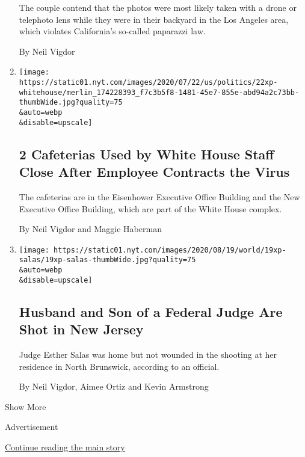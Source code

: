\begin{enumerate}
  The couple contend that the photos were most likely taken with a drone
  or telephoto lens while they were in their backyard in the Los Angeles
  area, which violates California's so-called paparazzi law.

  By Neil Vigdor
\item
  \href{/2020/07/22/us/politics/white-house-employee-covid-19.html}{}

  \texttt{[image: https://static01.nyt.com/images/2020/07/22/us/politics/22xp-whitehouse/merlin\_174228393\_f7c3b5f8-1481-45e7-855e-abd94a2c73bb-thumbWide.jpg?quality=75\\\&auto=webp\\\&disable=upscale]}

  \hypertarget{2-cafeterias-used-by-white-house-staff-close-after-employee-contracts-the-virus}{%
  \subsection{2 Cafeterias Used by White House Staff Close After
  Employee Contracts the
  Virus}\label{2-cafeterias-used-by-white-house-staff-close-after-employee-contracts-the-virus}}

  The cafeterias are in the Eisenhower Executive Office Building and the
  New Executive Office Building, which are part of the White House
  complex.

  By Neil Vigdor and Maggie Haberman
\item
  \href{/2020/07/19/nyregion/shooting-nj-judge-esther-salas.html}{}

  \texttt{[image: https://static01.nyt.com/images/2020/08/19/world/19xp-salas/19xp-salas-thumbWide.jpg?quality=75\\\&auto=webp\\\&disable=upscale]}

  \hypertarget{husband-and-son-of-a-federal-judge-are-shot-in-new-jersey}{%
  \subsection{Husband and Son of a Federal Judge Are Shot in New
  Jersey}\label{husband-and-son-of-a-federal-judge-are-shot-in-new-jersey}}

  Judge Esther Salas was home but not wounded in the shooting at her
  residence in North Brunswick, according to an official.

  By Neil Vigdor, Aimee Ortiz and Kevin Armstrong
\end{enumerate}

Show More

Advertisement

\protect\hyperlink{after-mid2}{Continue reading the main story}

